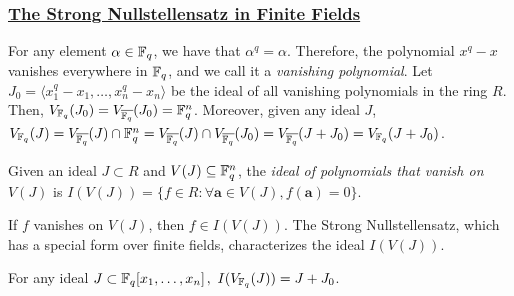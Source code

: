 \subsubsection{\underline{The Strong Nullstellensatz in Finite Fields}}

For any element $\alpha\in{\mathbb{F}}_{q}$, we have that
$\alpha^q=\alpha$. Therefore, the polynomial $x^q-x$ vanishes
everywhere in ${\mathbb{F}}_{q}$, and we call it a {\it vanishing polynomial}. Let
$J_0 = \langle x_1^q-x_1,\dots,x_n^q-x_n\rangle$ be the ideal of all
vanishing polynomials in the ring $R$. Then, $V_{{\mathbb{F}}_{q}}(J_0) =
V_{{\overline{{\mathbb{F}}_q}}}(J_0) = {\mathbb{F}}_{q}^n$. Moreover, given any ideal $J$, $V_{{\mathbb{F}}_{q}}(J) =
V_{{\overline{{\mathbb{F}}_q}}}(J) \cap{\mathbb{F}}_{q}^n = V_{{\overline{{\mathbb{F}}_q}}}(J) \cap V_{{\overline{{\mathbb{F}}_q}}}(J_0) =
V_{{\overline{{\mathbb{F}}_q}}}(J+J_0) = V_{{\mathbb{F}}_{q}}(J+J_0)$. 


\begin{Definition}
Given an ideal $J\subset R$ and $V(J) \subseteq {\mathbb{F}}_{q}^n$, the {\it ideal
of polynomials that vanish on} $V(J)$ is $I(V(J)) = \{ f \in R :
\forall \bm{a} \in V(J), f(\bm{a}) = 0\}$.
\end{Definition}

If $f$ vanishes on $V(J)$, then $f \in I(V(J))$. The Strong
Nullstellensatz, which has a special form over finite fields,
characterizes the ideal $I(V(J))$.

\begin{Theorem} \label{thm:strong-ns}  
For any ideal $J \subset {\mathbb{F}}_{q}[x_1,\dots,x_n]$$, ~I(V_{{\mathbb{F}}_{q}}(J)) = J + J_0$.
\end{Theorem}



